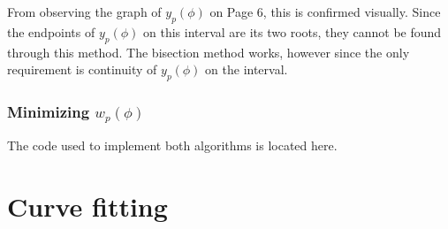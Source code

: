 From observing the graph of $y_p(\phi)$ on Page 6, this is confirmed visually. Since the endpoints of $y_p(\phi)$ on this interval are its two roots,
they cannot be found through this method. The bisection method works, however since the only requirement is continuity of $y_p(\phi)$ on the interval.

\subsubsection{Minimizing \texorpdfstring{$w_p(\phi)$}{}}

The code used to implement both algorithms is located here.

\section{Curve fitting}